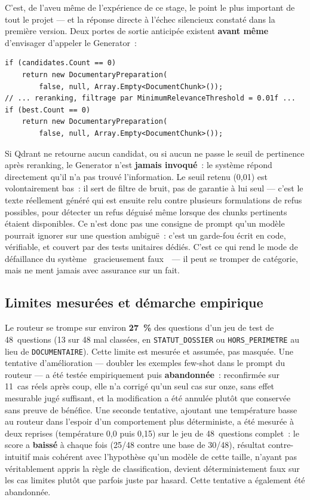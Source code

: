 \documentclass[12pt,a4paper]{article}
\newcommand{\code}[1]{\texttt{\small #1}}
\begin{document}
C'est, de l'aveu m\^eme de l'exp\'erience de ce stage, le point le plus important de tout le projet --- et la r\'eponse directe \`a l'\'echec silencieux constat\'e dans la premi\`ere version. Deux portes de sortie anticip\'ee existent \textbf{avant m\^eme} d'envisager d'appeler le Generator~:
\begin{center}\footnotesize
\begin{verbatim}
if (candidates.Count == 0)
    return new DocumentaryPreparation(
        false, null, Array.Empty<DocumentChunk>());
// ... reranking, filtrage par MinimumRelevanceThreshold = 0.01f ...
if (best.Count == 0)
    return new DocumentaryPreparation(
        false, null, Array.Empty<DocumentChunk>());
\end{verbatim}
\end{center}
Si Qdrant ne retourne aucun candidat, ou si aucun ne passe le seuil de pertinence apr\`es reranking, le Generator n'est \textbf{jamais invoqu\'e}~: le syst\`eme r\'epond directement qu'il n'a pas trouv\'e l'information. Le seuil retenu (0,01) est volontairement bas~: il sert de filtre de bruit, pas de garantie \`a lui seul --- c'est le texte r\'eellement g\'en\'er\'e qui est ensuite relu contre plusieurs formulations de refus possibles, pour d\'etecter un refus d\'eguis\'e m\^eme lorsque des chunks pertinents \'etaient disponibles. Ce n'est donc pas une consigne de prompt qu'un mod\`ele pourrait ignorer sur une question ambigu\"e~: c'est un garde-fou \'ecrit en code, v\'erifiable, et couvert par des tests unitaires d\'edi\'es. C'est ce qui rend le mode de d\'efaillance du syst\`eme \guillemotleft~gracieusement faux~\guillemotright~--- il peut se tromper de cat\'egorie, mais ne ment jamais avec assurance sur un fait.

\subsection{Limites mesur\'ees et d\'emarche empirique}

Le routeur se trompe sur environ \textbf{27~\%} des questions d'un jeu de test de 48~questions (13 sur 48 mal class\'ees, en \code{STATUT\_DOSSIER} ou \code{HORS\_PERIMETRE} au lieu de \code{DOCUMENTAIRE}). Cette limite est mesur\'ee et assum\'ee, pas masqu\'ee. Une tentative d'am\'elioration --- doubler les exemples few-shot dans le prompt du routeur --- a \'et\'e test\'ee empiriquement puis \textbf{abandonn\'ee}~: reconfirm\'ee sur 11~cas r\'eels apr\`es coup, elle n'a corrig\'e qu'un seul cas sur onze, sans effet mesurable jugé suffisant, et la modification a \'et\'e annul\'ee plut\^ot que conserv\'ee sans preuve de b\'en\'efice. Une seconde tentative, ajoutant une temp\'erature basse au routeur dans l'espoir d'un comportement plus d\'eterministe, a \'et\'e mesur\'ee \`a deux reprises (temp\'erature 0,0 puis 0,15) sur le jeu de 48~questions complet~: le score a \textbf{baiss\'e} \`a chaque fois (25/48 contre une base de 30/48), r\'esultat contre-intuitif mais coh\'erent avec l'hypoth\`ese qu'un mod\`ele de cette taille, n'ayant pas v\'eritablement appris la r\`egle de classification, devient d\'eterministement faux sur les cas limites plut\^ot que parfois juste par hasard. Cette tentative a \'egalement \'et\'e abandonn\'ee.
\end{document}
